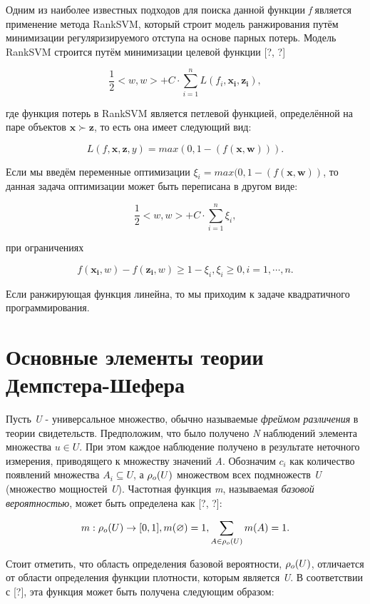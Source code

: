 \documentclass[12pt,a4paper,oneside]{article}
\begin{document}
\par
Одним из наиболее известных подходов для поиска данной функции \emph{f} является применение метода RankSVM, который строит модель ранжирования путём минимизации регуляризируемого отступа на основе парных потерь. 
Модель RankSVM строится путём минимизации целевой функции [?, ?]

\[
\frac{1}{2} <w, w> + C \cdot \sum \limits_{i=1}^n L(f_i, \mathbf{x_i}, \mathbf{z_i}),
\]

где функция потерь в RankSVM является петлевой функцией, определённой на паре объектов \(\mathbf{x} \succ \mathbf{z}\), то есть она имеет следующий вид:

\[
L(f, \mathbf{x}, \mathbf{z}, y) = max(0, 1 - (f(\mathbf{x}, \mathbf{w}))).
\]

Если мы введём переменные оптимизации \(\xi_i = max(0, 1 - (f(\mathbf{x}, \mathbf{w}))\), то данная задача оптимизации может быть переписана в другом виде:

\[
\frac{1}{2}<w, w> + C \cdot \sum \limits_{i=1}^n \xi_i,
\]

при ограничениях

\[
f(\mathbf{x_i}, w) - f(\mathbf{z_i}, w) \geq 1 - \xi_i, 
\xi_i \geq 0, i = 1, \cdots, n.
\]

Если ранжирующая функция линейна, то мы приходим к задаче квадратичного программирования.

\section{Основные элементы теории Демпстера-Шефера}
\label{sec:dst_definitions}

\par
Пусть \emph{U} - универсальное множество, обычно называемые \emph{фреймом различения} в теории свидетельств. 
Предположим, что было получено \emph{N} наблюдений элемента множества \(u \in U\).
При этом каждое наблюдение получено в результате неточного измерения, приводящего к множеству значений \emph{A}.
Обозначим \(c_i\) как количество появлений множества \(A_i \subseteq U\), а \(\mathrm{\rho}_o(U)\) множеством всех подмножеств \emph{U} (множество мощностей \emph{U}).
Частотная функция \emph{m}, называемая \emph{базовой вероятностью}, может быть определена как [?, ?]:

\[
m : \mathrm{\rho}_o(U) \to [0,1],
m(\varnothing) = 1, \sum \limits_{A \in \mathrm{\rho}_o(U)} m(A) = 1.
\]

\par
Стоит отметить, что область определения базовой вероятности, \(\mathrm{\rho}_o(U)\), отличается от области определения функции плотности, которым является \emph{U}. 
В соответствии с [?], эта функция может быть получена следующим образом:
\end{document}

